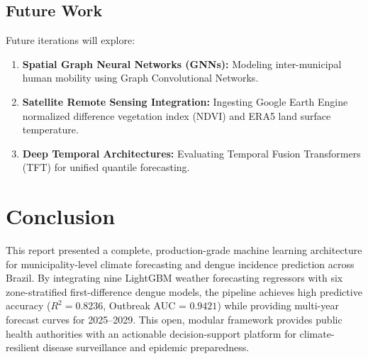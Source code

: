 \documentclass[journal,onecolumn,11pt]{IEEEtran}
\begin{document}
\subsection{Future Work}
Future iterations will explore:
\begin{enumerate}
    \item \textbf{Spatial Graph Neural Networks (GNNs):} Modeling inter-municipal human mobility using Graph Convolutional Networks.
    \item \textbf{Satellite Remote Sensing Integration:} Ingesting Google Earth Engine normalized difference vegetation index (NDVI) and ERA5 land surface temperature.
    \item \textbf{Deep Temporal Architectures:} Evaluating Temporal Fusion Transformers (TFT) for unified quantile forecasting.
\end{enumerate}

\section{Conclusion}
This report presented a complete, production-grade machine learning architecture for municipality-level climate forecasting and dengue incidence prediction across Brazil. By integrating nine LightGBM weather forecasting regressors with six zone-stratified first-difference dengue models, the pipeline achieves high predictive accuracy ($R^2 = 0.8236$, Outbreak AUC = $0.9421$) while providing multi-year forecast curves for 2025--2029. This open, modular framework provides public health authorities with an actionable decision-support platform for climate-resilient disease surveillance and epidemic preparedness.
\end{document}
